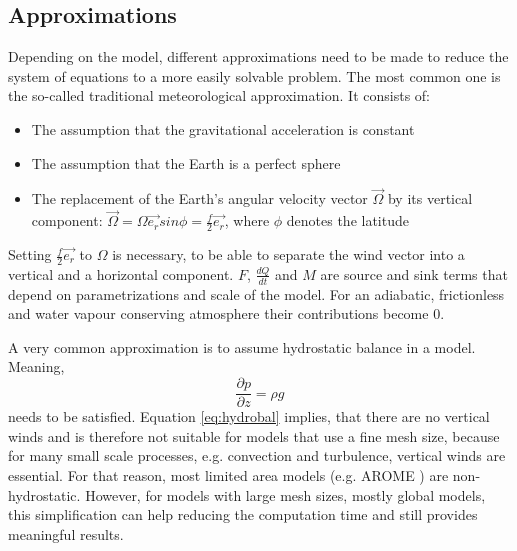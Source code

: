 \subsection{Approximations}
\label{subsec:approx}
Depending on the model, different approximations need to be made to reduce the system of equations to a more easily solvable problem.
The most common one is the so-called traditional meteorological approximation. It consists of:
    \begin{itemize}
        \item{The assumption that the gravitational acceleration is constant}
        \item{The assumption that the Earth is a perfect sphere}
        \item {The replacement of the Earth's angular velocity vector $\vec {\Omega}$ by its vertical component: $\vec {\Omega} = \Omega \vec{e_{r}}sin \phi = \frac{f}{2} \vec{e_{r}} $, where $\phi$ denotes the latitude}
    \end{itemize}
Setting $\frac{f}{2} \vec{e_{r}}$ to $\Omega$ is necessary, to be able to separate the wind vector into a vertical and a horizontal component.
$F$, $\frac{dQ}{dt}$ and $M$ are source and sink terms that depend on parametrizations and scale of the model. For an adiabatic, frictionless and water vapour conserving atmosphere their contributions become 0.

A very common approximation is to assume hydrostatic balance in a model. Meaning, 
\begin{equation}
    \frac{\partial p}{ \partial z } = \rho g
    \label{eq:hydrobal}
\end{equation} 
needs to be satisfied.
Equation \eqref{eq:hydrobal} implies, that there are no vertical winds and is therefore not suitable for models that use a fine mesh size, because for many small scale processes, e.g. convection and turbulence, vertical winds are essential. For that reason, most limited area models (e.g. AROME \cite{gmd-2017-103}) are non-hydrostatic. However, for models with large mesh sizes, mostly global models, this simplification can help reducing the computation time and still provides meaningful results.


